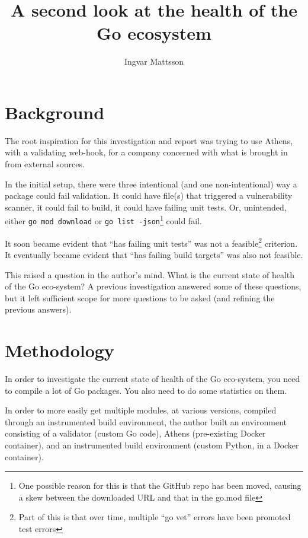 \documentclass[a4paper]{paper}
\begin{document}
\title{A second look at the health of the Go ecosystem}
\author{Ingvar Mattsson}

\maketitle

\section{Background}

The root inspiration for this investigation and report was trying to
use Athens, with a validating web-hook, for a company concerned with
what is brought in from external sources.

In the initial setup, there were three intentional (and one
non-intentional) way a package could fail validation. It could have
file(s) that triggered a vulnerability scanner, it could fail to
build, it could have failing unit tests. Or, unintended, either {\tt go
mod download} or {\tt go list -json}\footnote{One possible reason for this is that the GitHub repo has been moved, causing a skew between the downloaded URL and that in the go.mod file} could fail.

It soon became evident that ``has failing unit tests'' was not a
feasible\footnote{Part of this is that over time, multiple ``go vet''
  errors have been promoted test errors} criterion. It eventually
became evident that ``has failing build targets'' was also not
feasible.

This raised a question in the author's mind. What is the current state
of health of the Go eco-system? A previous investigation answered some of these questions, but it left sufficient scope for more questions to be asked (and refining the previous answers).

\section{Methodology}

In order to investigate the current state of health of the Go
eco-system, you need to compile a lot of Go packages. You also need to
do some statistics on them.

In order to more easily get multiple modules, at various versions,
compiled through an instrumented build environment, the author built
an environment consisting of a validator (custom Go code), Athens
(pre-existing Docker container), and an instrumented build environment
(custom Python, in a Docker container).
\end{document}
